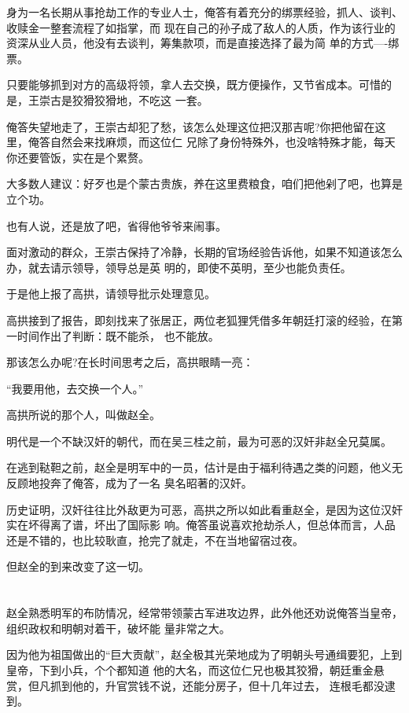 \documentclass[11pt,a4paper,onecolumn]{article}
\begin{document}
身为一名长期从事抢劫工作的专业人士，俺答有着充分的绑票经验，抓人、谈判、收赎金一整套流程了如指掌，而
现在自己的孙子成了敌人的人质，作为该行业的资深从业人员，他没有去谈判，筹集款项，而是直接选择了最为简
单的方式----绑票。

只要能够抓到对方的高级将领，拿人去交换，既方便操作，又节省成本。可惜的是，王崇古是狡猾狡猾地，不吃这
一套。

俺答失望地走了，王崇古却犯了愁，该怎么处理这位把汉那吉呢?你把他留在这里，俺答自然会来找麻烦，而这位仁
兄除了身份特殊外，也没啥特殊才能，每天你还要管饭，实在是个累赘。

大多数人建议：好歹也是个蒙古贵族，养在这里费粮食，咱们把他剁了吧，也算是立个功。

也有人说，还是放了吧，省得他爷爷来闹事。

面对激动的群众，王崇古保持了冷静，长期的官场经验告诉他，如果不知道该怎么办，就去请示领导，领导总是英
明的，即使不英明，至少也能负责任。

于是他上报了高拱，请领导批示处理意见。

高拱接到了报告，即刻找来了张居正，两位老狐狸凭借多年朝廷打滚的经验，在第一时间作出了判断：既不能杀，
也不能放。

那该怎么办呢?在长时间思考之后，高拱眼睛一亮：

``我要用他，去交换一个人。''

高拱所说的那个人，叫做赵全。

明代是一个不缺汉奸的朝代，而在吴三桂之前，最为可恶的汉奸非赵全兄莫属。

在逃到鞑靼之前，赵全是明军中的一员，估计是由于福利待遇之类的问题，他义无反顾地投奔了俺答，成为了一名
臭名昭著的汉奸。

历史证明，汉奸往往比外敌更为可恶，高拱之所以如此看重赵全，是因为这位汉奸实在坏得离了谱，坏出了国际影
响。俺答虽说喜欢抢劫杀人，但总体而言，人品还是不错的，也比较耿直，抢完了就走，不在当地留宿过夜。

但赵全的到来改变了这一切。

\section[\thesection]{}

赵全熟悉明军的布防情况，经常带领蒙古军进攻边界，此外他还劝说俺答当皇帝，组织政权和明朝对着干，破坏能
量非常之大。

因为他为祖国做出的``巨大贡献''，赵全极其光荣地成为了明朝头号通缉要犯，上到皇帝，下到小兵，个个都知道
他的大名，而这位仁兄也极其狡猾，朝廷重金悬赏，但凡抓到他的，升官赏钱不说，还能分房子，但十几年过去，
连根毛都没逮到。
\end{document}

